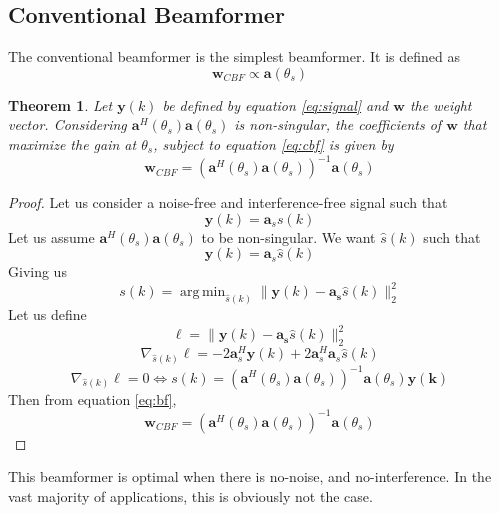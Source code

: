 \documentclass[12pt]{article}
\DeclareMathOperator*{\argmin}{arg\,min}
\newtheorem{theorem}{Theorem}
\begin{document}
\subsection{Conventional Beamformer}
The conventional beamformer is the simplest beamformer. It is defined as
\begin{equation}\label{eq:cbf}
   \mathbf{w}_{CBF} \propto \mathbf{a}(\theta_s)
\end{equation}
\begin{theorem}
    Let $\mathbf{y}(k)$ be defined by equation \ref{eq:signal} and $\mathbf{w}$ the weight vector. Considering $\mathbf{a}^H(\theta_s)\mathbf{a}(\theta_s)$ is non-singular, the coefficients of $\mathbf{w}$ that maximize the gain at $\theta_s$, subject to equation \ref{eq:cbf} is given by
    \begin{equation}
        \mathbf{w}_{CBF} = \left(\mathbf{a}^H(\theta_s)\mathbf{a}(\theta_s)\right)^{-1}\mathbf{a}(\theta_s)
    \end{equation}
\end{theorem}
\begin{proof}
    Let us consider a noise-free and interference-free signal such that 
    \begin{equation*}
        \mathbf{y}(k) = \mathbf{a}_ss(k)
    \end{equation*} 
    Let us assume $\mathbf{a}^H(\theta_s)\mathbf{a}(\theta_s)$ to be non-singular. We want $\hat{s}(k)$ such that
    \begin{equation*}
        \mathbf{y}(k) = \mathbf{a}_s\hat{s}(k)
    \end{equation*}
    Giving us
    \begin{equation*}
        s(k) = \argmin_{\hat{s}(k)} \|\mathbf{y}(k)-\mathbf{a_s}\hat{s}(k)\|_2^2
    \end{equation*}
    Let us define
    \begin{equation*}
        \ell = \|\mathbf{y}(k)-\mathbf{a_s}\hat{s}(k)\|_2^2
    \end{equation*}
    \begin{equation*}
        \nabla_{\hat{s}(k)}\ell = -2\mathbf{a}_s^H\mathbf{y}(k)+2\mathbf{a}_s^H\mathbf{a}_s\hat{s}(k)
    \end{equation*}
    \begin{equation*}
         \nabla_{\hat{s}(k)}\ell = 0 \Leftrightarrow s(k) = \left(\mathbf{a}^H(\theta_s)\mathbf{a}(\theta_s)\right)^{-1}\mathbf{a}(\theta_s)\mathbf{y(k)}
    \end{equation*}
    Then from equation \ref{eq:bf}, 
    \begin{equation*}
        \mathbf{w}_{CBF} = \left(\mathbf{a}^H(\theta_s)\mathbf{a}(\theta_s)\right)^{-1}\mathbf{a}(\theta_s)
    \end{equation*}
\end{proof}
This beamformer is optimal when there is no-noise, and no-interference. In the vast majority of applications, this is obviously not the case. 
\end{document}
